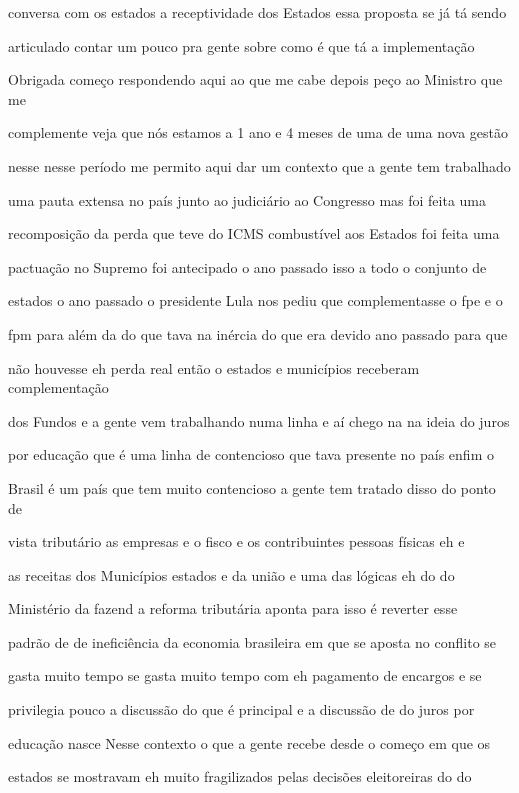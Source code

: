 \documentclass[a4paper,12pt]{article}
\begin{document}
conversa com os estados a receptividade dos Estados essa proposta se já tá sendo

articulado contar um pouco pra gente sobre como é que tá a implementação

Obrigada começo respondendo aqui ao que me cabe depois peço ao Ministro que me

complemente veja que nós estamos a 1 ano e 4 meses de uma de uma nova gestão

nesse nesse período me permito aqui dar um contexto que a gente tem trabalhado

uma pauta extensa no país junto ao judiciário ao Congresso mas foi feita uma

recomposição da perda que teve do ICMS combustível aos Estados foi feita uma

pactuação no Supremo foi antecipado o ano passado isso a todo o conjunto de

estados o ano passado o presidente Lula nos pediu que complementasse o fpe e o

fpm para além da do que tava na inércia do que era devido ano passado para que

não houvesse eh perda real então o estados e municípios receberam complementação

dos Fundos e a gente vem trabalhando numa linha e aí chego na na ideia do juros

por educação que é uma linha de contencioso que tava presente no país enfim o

Brasil é um país que tem muito contencioso a gente tem tratado disso do ponto de

vista tributário as empresas e o fisco e os contribuintes pessoas físicas eh e

as receitas dos Municípios estados e da união e uma das lógicas eh do do

Ministério da fazend a reforma tributária aponta para isso é reverter esse

padrão de de ineficiência da economia brasileira em que se aposta no conflito se

gasta muito tempo se gasta muito tempo com eh pagamento de encargos e se

privilegia pouco a discussão do que é principal e a discussão de do juros por

educação nasce Nesse contexto o que a gente recebe desde o começo em que os

estados se mostravam eh muito fragilizados pelas decisões eleitoreiras do do
\end{document}
